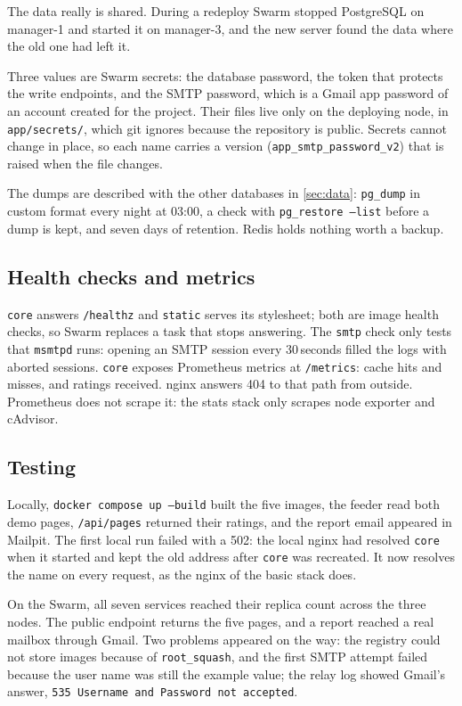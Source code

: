 The data really is shared. During a redeploy Swarm stopped PostgreSQL on
manager-1 and started it on manager-3, and the new server found the
data where the old one had left it.

Three values are Swarm secrets: the database password, the token that
protects the write endpoints, and the SMTP password, which is a Gmail
app password of an account created for the project. Their files live
only on the deploying node, in \texttt{app/secrets/}, which git ignores
because the repository is public. Secrets cannot change in place, so
each name carries a version (\texttt{app\_smtp\_password\_v2}) that is
raised when the file changes.

The dumps are described with the other databases in \cref{sec:data}:
\texttt{pg\_dump} in custom format every night at 03:00, a check with
\texttt{pg\_restore --list} before a dump is kept, and seven days of
retention. Redis holds nothing worth a backup.

\subsection{Health checks and metrics}

\texttt{core} answers \texttt{/healthz} and \texttt{static} serves its
stylesheet; both are image health checks, so Swarm replaces a task that
stops answering. The \texttt{smtp} check only tests that \texttt{msmtpd}
runs: opening an SMTP session every 30\,seconds filled the logs with
aborted sessions. \texttt{core} exposes Prometheus metrics at
\texttt{/metrics}: cache hits and misses, and ratings received. nginx
answers 404 to that path from outside. Prometheus does not scrape it:
the stats stack only scrapes node exporter and cAdvisor.

\subsection{Testing}

Locally, \texttt{docker compose up --build} built the five images, the
feeder read both demo pages, \texttt{/api/pages} returned their
ratings, and the report email appeared in Mailpit. The first local run
failed with a 502: the local nginx had resolved \texttt{core} when it
started and kept the old address after \texttt{core} was recreated. It
now resolves the name on every request, as the nginx of the basic stack
does.

On the Swarm, all seven services reached their replica count across the
three nodes. The public endpoint returns the five pages, and a report
reached a real mailbox through Gmail. Two problems appeared on the
way: the registry could not store images because of
\texttt{root\_squash}, and the first SMTP attempt failed because the
user name was still the example value; the relay log showed Gmail's
answer, \texttt{535 Username and Password not accepted}.
